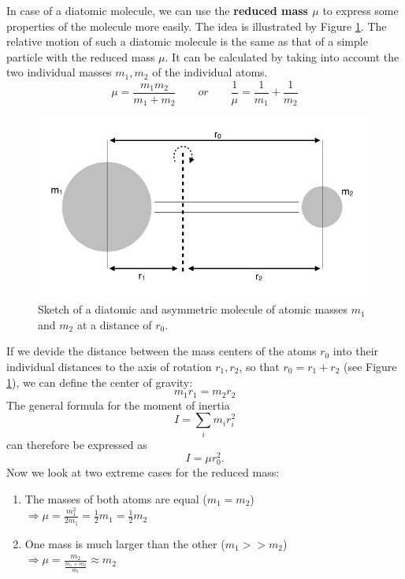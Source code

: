 In case of a diatomic molecule, we can use the \textbf{reduced mass
  $\mu$} to express some properties of the molecule more easily. The
idea is illustrated by Figure \ref{fig:reduced_mass}. The relative motion
of such a diatomic molecule is the same as that of a simple particle
with the reduced mass $\mu$. It can be calculated by taking into
account the two individual masses $m_1, m_2$ of the individual atoms.
\begin{equation}
\mu = \frac{m_1 m_2}{m_1+m_2} \qquad or \qquad \frac{1}{\mu} = \frac{1}{m_1} + \frac{1}{m_2}
\end{equation}

\begin{figure}[htbp]
\begin{center}
\includegraphics[width=1\textwidth]{figures/Reduced_mass}
\caption{Sketch of a diatomic and asymmetric molecule of atomic masses $m_1$ and $m_2$ at a distance of $r_0$.}
\label{fig:reduced_mass}
\end{center}
\end{figure}

If we devide the distance between the mass centers of the atoms $r_0$
into their individual distances to the axis of rotation $r_1, r_2$, so
that $r_0 = r_1 + r_2$ (see Figure \ref{fig:reduced_mass}), we can
define the center of gravity:
\begin{equation*}
m_1 r_1 = m_2 r_2
\end{equation*}
The general formula for the moment of inertia 
\begin{equation*}
I = \sum_i m_i r_i^2 
\end{equation*}
can therefore be expressed as 
\begin{equation}
I = \mu r_0^2.
\end{equation}
Now we look at two extreme cases for the reduced mass:
\begin{enumerate}
\item The masses of both atoms are equal ($m_1 = m_2$) \\
  $\Rightarrow \mu = \frac{m_1^2}{2m_1} = \frac{1}{2}m_1 = \frac{1}{2}m_2$
\item One mass is much larger than the other ($m_1 >> m_2$) \\
  $\Rightarrow \mu = \frac{m_2}{\frac{m_1 + m_2}{m_1}} \approx m_2$ 
\end{enumerate}

